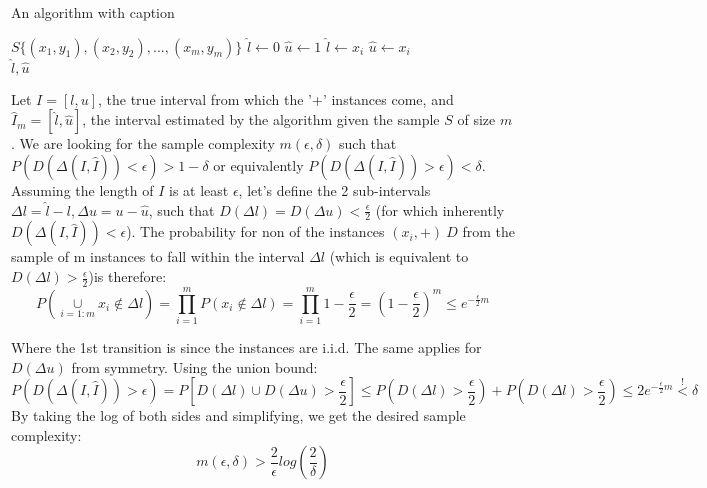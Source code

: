 \begin{algorithm}
    \caption{An algorithm with caption}\label{alg:cap}
    \begin{algorithmic}
        \Require $S\{(x_1, y_1), (x_2, y_2), ..., (x_m, y_m)\}$
        \State $\hat{l} \gets 0$
        \State $\hat{u} \gets 1$
                    \State $\hat{l} \gets x_i$
                \EndIf
                    \State $\hat{u} \gets x_i$
                \EndIf
            \EndIf
        \EndFor \\
    \Return $\hat{l}, \hat{u}$
    \end{algorithmic}
\end{algorithm}

Let $I = [l, u]$, the true interval from which the '+' instances come, and $\hat{I}_m = [\hat{l}, \hat{u}]$, 
the interval estimated by the algorithm given the sample $S$ of size $m$.
We are looking for the sample complexity $m(\epsilon, \delta)$ such that $P(D(\Delta(I, \hat{I})) < \epsilon) > 1-\delta$ 
or equivalently $P(D(\Delta(I, \hat{I})) > \epsilon) < \delta$.
Assuming the length of $I$ is at least $\epsilon$, let's define the 2 sub-intervals $\Delta l = \hat{l} - l, \Delta u = u - \hat{u}$, 
such that $D(\Delta l) = D(\Delta u) < \frac{\epsilon}{2}$ (for which inherently $D(\Delta(I, \hat{I})) < \epsilon$).
The probability for non of the instances $(x_i, +)~D$ from the sample of m instances to fall within the interval $\Delta l$ 
(which is equivalent to $D(\Delta l) > \frac{\epsilon}{2}$)is therefore:
\begin{equation*}
    P(\underset{i=1:m}{\cup} x_i \notin \Delta l) = \prod_{i=1}^{m}P(x_i \notin \Delta l) 
    = \prod_{i=1}^{m} 1-\frac{\epsilon}{2}= (1-\frac{\epsilon}{2})^m \leq e^{-\frac{\epsilon}{2}m}
\end{equation*}

Where the 1st transition is since the instances are i.i.d. The same applies for $D(\Delta u)$ from symmetry.
Using the union bound:
\begin{equation*}
    P(D(\Delta(I, \hat{I})) > \epsilon) = P\left[D(\Delta l) \cup D(\Delta u) > \frac{\epsilon}{2}\right] 
    \leq P(D(\Delta l) > \frac{\epsilon}{2}) + P(D(\Delta l) > \frac{\epsilon}{2}) \leq 2e^{-\frac{\epsilon}{2}m} \overset{!}{<} \delta
\end{equation*}
By taking the log of both sides and simplifying, we get the desired sample complexity:
\begin{equation*}
    m(\epsilon, \delta) > \frac{2}{\epsilon} log(\frac{2}{\delta})
\end{equation*}


